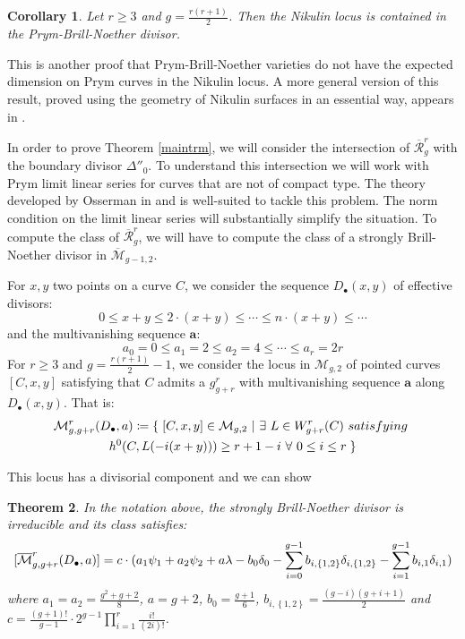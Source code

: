 \documentclass{article}
\theoremstyle{plain}
\newtheorem{trm}{Theorem}[section]
\newtheorem{cor}[trm]{Corollary}
\theoremstyle{definition}
\def\cM{\mathcal{M}}
\def\rr{\overline{\mathcal{R}}}
\def\mm{\overline{\mathcal{M}}}
\begin{document}
\begin{cor} \label{nikulin} Let $r\geq 3$ and $g = \frac{r(r+1)}{2}$. Then the Nikulin locus is contained in the Prym-Brill-Noether divisor. 
\end{cor} 

This is another proof that Prym-Brill-Noether varieties do not have the expected dimension on Prym curves in the Nikulin locus. A more general version of this result, proved using the geometry of Nikulin surfaces in an essential way, appears in \cite{Lelli-Chiesa-lowgenus}. 

In order to prove Theorem \ref{maintrm}, we will consider the intersection of $\rr^r_g$ with the boundary divisor $\Delta''_0$. To understand this intersection we will work with Prym limit linear series for curves that are not of compact type. The theory developed by Osserman in \cite{Ossermandim} and \cite{Ossermancompacttype} is well-suited to tackle this problem. The norm condition on the limit linear series will substantially simplify the situation. To compute the class of $\rr^r_g$, we will have to compute the class of a strongly Brill-Noether divisor in $\mm_{g-1,2}$. 

For $x,y$ two points on a curve $C$, we consider the sequence $D_\bullet(x,y)$ of effective divisors: 
\[ 0 \leq x+y \leq 2\cdot(x+y) \leq \cdots \leq n\cdot (x+y) \leq \cdots\]
and the multivanishing sequence $\textbf{a}$:
\[ a_0 = 0 \leq a_1 = 2 \leq a_2 = 4 \leq \cdots \leq a_r = 2r  \] 
For $r \geq 3$ and $ g = \frac{r(r+1)}{2} - 1$, we consider the locus in $\cM_{g,2}$ of pointed curves $[C, x, y]$ satisfying that $C$ admits a $g^r_{g+r}$ with multivanishing sequence $\textbf{a}$ along  $D_\bullet(x,y)$. That is: 
\begin{multline*} \cM^r_{g, g+r}\text{\large (}D_\bullet, \textbf{a}\text{\large )} \coloneqq \left\{ \right. [C,x,y] \in \cM_{g,2} \ | \ \exists \ L\in W^r_{g+r}(C) \ \textrm{satisfying} \ \\  h^0\text{\Large (}C,L(-i(x+y))\text{\Large )} \geq r+1-i \ \forall \ 0\leq i \leq r \left.\right\} 
\end{multline*}

This locus has a divisorial component and we can show 

\begin{trm} \normalfont \label{stronglyBNdiv} In the notation above, the strongly Brill-Noether divisor is irreducible and its class satisfies: 
\[[\mm^r_{g, g+r}\text{\large (}D_\bullet, \textbf{a}\text{\large )}] = c\cdot(a_1\psi_1 + a_2\psi_2 + a\lambda - b_0\delta_0 - \sum_{i=0}^{g-1} b_{i, \left\{1,2\right\}}\delta_{i, \left\{1,2\right\}} - \sum_{i=1}^{g-1}b_{i,1}\delta_{i,1}) \]
where $a_1 = a_2 = \frac{g^2+g+2}{8}$, $a = g+2$, $b_0 = \frac{g+1}{6}$, $b_{i,\left\{1,2\right\}} = \frac{(g-i)(g+i+1)}{2}$ and $c = \frac{(g+1)!}{g-1}\cdot 2^{g-1}\prod_{i=1}^{r}\frac{i!}{(2i)!}$. 
\end{trm}
\end{document}
